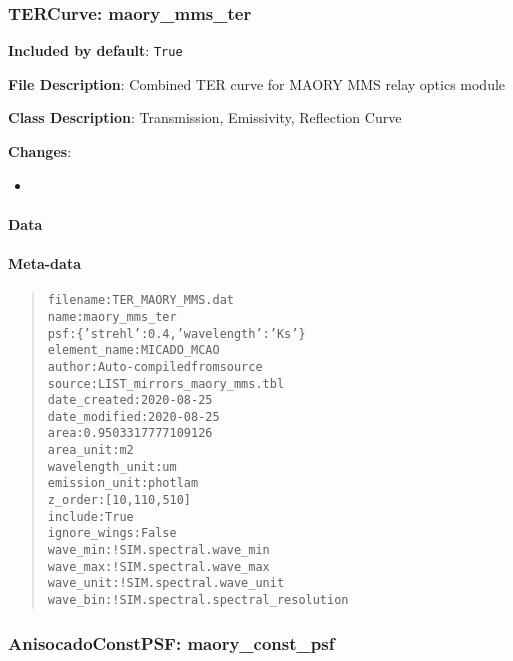 \subsubsection{TERCurve: \textquotedbl{}maory\_mms\_ter\textquotedbl{}%
  \label{tercurve-maory-mms-ter}%
}

\textbf{Included by default}: \texttt{True}

\textbf{File Description}: Combined TER curve for MAORY MMS relay optics module

\textbf{Class Description}: Transmission, Emissivity, Reflection Curve

\textbf{Changes}:

\begin{itemize}
\item \end{itemize}


\paragraph{Data%
  \label{data}%
}


\paragraph{Meta-data%
  \label{meta-data}%
}

\begin{quote}
\begin{alltt}
       filename : TER_MAORY_MMS.dat
           name : maory_mms_ter
            psf : \{'strehl': 0.4, 'wavelength': 'Ks'\}
   element_name : MICADO_MCAO
         author : Auto-compiled from source
         source : LIST_mirrors_maory_mms.tbl
   date_created : 2020-08-25
  date_modified : 2020-08-25
           area : 0.9503317777109126
      area_unit : m2
wavelength_unit : um
  emission_unit : photlam
        z_order : [10, 110, 510]
        include : True
   ignore_wings : False
       wave_min : !SIM.spectral.wave_min
       wave_max : !SIM.spectral.wave_max
      wave_unit : !SIM.spectral.wave_unit
       wave_bin : !SIM.spectral.spectral_resolution
\end{alltt}
\end{quote}


\subsubsection{AnisocadoConstPSF: \textquotedbl{}maory\_const\_psf\textquotedbl{}%
  \label{anisocadoconstpsf-maory-const-psf}%
}

